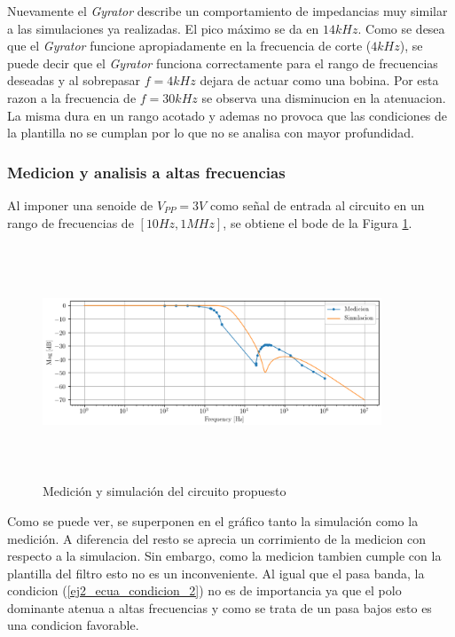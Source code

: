Nuevamente el \textit{Gyrator} describe un comportamiento de impedancias muy similar a las simulaciones ya realizadas. El pico máximo se da en $14 kHz$. Como se desea que el \textit{Gyrator} funcione apropiadamente en la frecuencia de corte ($4kHz$), se puede decir que el 
\textit{Gyrator} funciona correctamente para el rango de frecuencias deseadas y al sobrepasar $f = 4 kHz$ dejara de actuar como una bobina. Por esta razon a la frecuencia de $f=30kHz$ se observa una disminucion en la atenuacion. La misma dura en un rango acotado y ademas no provoca que las condiciones de la plantilla no se cumplan por lo que no se analisa con mayor profundidad. 


\subsubsection{Medicion y analisis a altas frecuencias}

Al imponer una senoide de $V_{PP} = 3V$ como señal de entrada al circuito en un rango de frecuencias de $[10Hz , 1MHz]$, se obtiene el bode de la Figura \ref{fig:ej2_lp_medicion}.

\begin{figure}[h!]                                                       
\centering\includegraphics[width=0.9\textwidth, height=7cm]{../Ex2/Resources/ej2_lp_med_and_sim.png}
\caption{Medición y simulación del circuito propuesto }
\label{fig:ej2_lp_medicion}
\end{figure}

Como se puede ver, se superponen en el gráfico tanto la simulación como la medición. A diferencia del resto se aprecia un corrimiento de la medicion con respecto a la simulacion. Sin embargo, como la medicion tambien cumple con la plantilla del filtro esto no es un inconveniente. Al igual que el pasa banda, la condicion (\ref{ej2_ecua_condicion_2}) no es de importancia ya que el polo dominante atenua a altas frecuencias y como se trata de un pasa bajos esto es una condicion favorable. 

